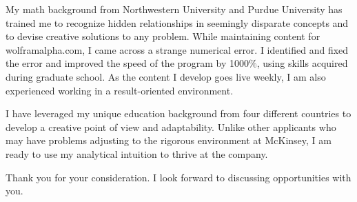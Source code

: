 \documentclass[11pt,a4paper,unicode]{moderncv}
\begin{document}
\vspace{3mm}
My math background from Northwestern University and Purdue University has trained me to recognize hidden relationships in seemingly disparate concepts and to devise creative solutions to any problem. While maintaining content for wolframalpha.com, I came across a strange numerical error. I identified and fixed the error and improved the speed of the program by 1000$\%$, using skills acquired during graduate school. As the content I develop goes live weekly, I am also experienced working in a result-oriented environment.

\vspace{3mm}
I have leveraged my unique education background from four different countries to develop a creative point of view and adaptability. Unlike other applicants who may have problems adjusting to the rigorous environment at McKinsey, I am ready to use my analytical intuition to thrive at the company. 

\vspace{3mm}
Thank you for your consideration. I look forward to discussing opportunities with you.

\vspace{3mm}
\makeletterclosing %
\fi
\end{document}
